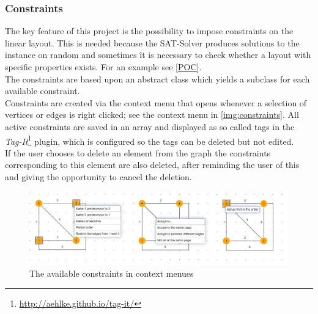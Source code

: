 {\subsubsection{Constraints}
\label{imp_constr}
The key feature of this project is the possibility to impose constraints on the linear layout. This is needed because the SAT-Solver produces solutions to the instance on random and sometimes ît is necessary to check whether a layout with specific properties exists. For an example see \autoref{POC}.\\
The constraints are based upon an abstract class which yields a subclass for each available constraint.\\
Constraints are created via the context menu that opens whenever a selection of vertices or edges is right clicked; see the context menu in \autoref{img:constraints}.
All active constraints are saved in an array and displayed as so called tags in the \textit{Tag-It}\footnote{\url{http://aehlke.github.io/tag-it/}} plugin, which is configured so the tags can be deleted but not edited.\\
If the user chooses to delete an element from the graph the constraints corresponding to this element are also deleted, after reminding the user of this and giving the opportunity to cancel the deletion.
\begin{figure}
\begin{center}
\includegraphics[width=\textwidth]{figures/figIndex/Constraints.jpg}
\caption{The available constraints in context menues}
\label{img:constraints}
\end{center}
\end{figure}
}
